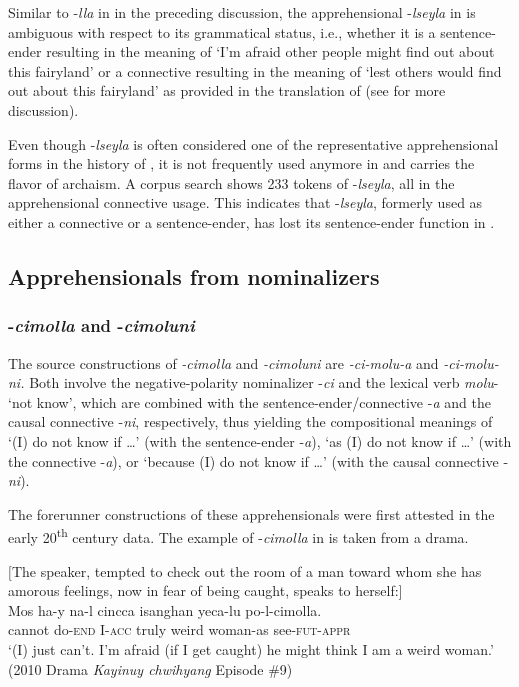 \documentclass[output=paper,colorlinks,citecolor=brown]{langscibook}
\begin{document}
 Similar to \nobreakdash-\textit{lla} in  in the preceding discussion, the apprehensional \nobreakdash-\textit{lseyla} in  is ambiguous with respect to its grammatical status, i.e., whether it is a sentence-ender resulting in the meaning of `I'm afraid other people might find out about this fairyland' or a connective resulting in the meaning of `lest others would find out about this fairyland' as provided in the translation of  (see  for more discussion).

Even though \nobreakdash-\textit{lseyla} is often considered one of the representative apprehensional forms in the history of , it is not frequently used anymore in  and carries the flavor of archaism. A corpus search shows 233 tokens of \nobreakdash-\textit{lseyla}, all in the apprehensional connective usage. This indicates that \nobreakdash-\textit{lseyla}, formerly used as either a connective or a sentence-ender, has lost its sentence-ender function in .


\subsection{Apprehensionals from nominalizers}
\label{subsec:nominalizers}

\subsubsection{-\textit{cimolla} and -\textit{cimoluni}}

The source constructions of \textit{-cimolla} and \textit{-cimoluni} are \textit{-ci-molu-a} and \textit{-ci-molu-ni.} Both involve the negative-polarity nominalizer \nobreakdash-\textit{ci} and the lexical verb \textit{molu}- `not know', which are combined with the sentence-ender/connective \nobreakdash-\textit{a} and the causal connective \nobreakdash-\textit{ni}, respectively, thus yielding the compositional meanings of `(I) do not know if …' (with the sentence-ender \nobreakdash-\textit{a}), `as (I) do not know if …' (with the connective \nobreakdash-\textit{a}), or `because (I) do not know if …' (with the causal connective \nobreakdash-\textit{ni}).

The forerunner constructions of these apprehensionals were first attested in the early 20\textsuperscript{th} century data. The  example of \nobreakdash-\textit{cimolla} in  is taken from a drama.

\ea \label{ex:RK12} \textnormal{$[$The speaker, tempted to check out the room of a man toward whom she has amorous feelings, now in fear of being caught, speaks to herself:$]$} \\
\gll Mos ha-y na-l cincca isanghan yeca-lu po-l-cimolla. \\
cannot do-\textsc{end} I-\textsc{acc} truly weird woman-as see-\textsc{fut-appr} \\
\glt `(I) just can't. I'm afraid (if I get caught) he might think I am a weird woman.' (2010 Drama \textit{Kayinuy chwihyang} Episode \#9)
\z
\end{document}
